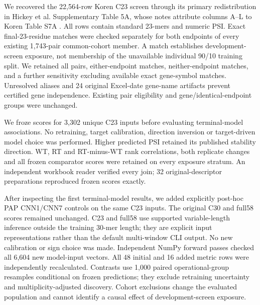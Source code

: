 \documentclass[11pt,a4paper]{article}
\begin{document}
We recovered the 22,564-row Koren C23 screen through its primary redistribution
in Hickey et al. Supplementary Table 5A, whose notes attribute columns A--L
to Koren Table S7A \cite{koren,hickey}. All rows contain standard 23-mers
and numeric PSI. Exact final-23-residue matches were checked separately for
both endpoints of every existing 1,743-pair common-cohort member. A match
establishes development-screen exposure, not membership of the unavailable
individual 90/10 training split. We retained all pairs, either-endpoint
matches, neither-endpoint matches, and a further sensitivity excluding
available exact gene-symbol matches. Unresolved aliases and 24 original
Excel-date gene-name artifacts prevent certified gene independence.
Existing pair eligibility and gene/identical-endpoint groups were unchanged.

We froze scores for 3,302 unique C23 inputs before evaluating terminal-model
associations. No retraining, target calibration, direction inversion or
target-driven model choice was performed. Higher predicted PSI retained its
published stability direction. WT, RT and RT-minus-WT rank correlations,
both replicate changes and all frozen comparator scores were retained on
every exposure stratum. An independent workbook reader verified every join;
32 original-descriptor preparations reproduced frozen scores exactly.

After inspecting the first terminal-model results, we added explicitly
post-hoc PAP CNN1/CNN7 controls on the same C23 inputs. The original C30 and
full58 scores remained unchanged. C23 and full58 use supported variable-length
inference outside the training 30-mer length; they are explicit input
representations rather than the default multi-window CLI output. No new
calibration or sign choice was made. Independent NumPy forward passes checked
all 6,604 new model-input vectors. All 48 initial and 16 added metric rows
were independently recalculated. Contrasts use 1,000 paired operational-group
resamples conditional on frozen predictions; they exclude retraining uncertainty
and multiplicity-adjusted discovery. Cohort exclusions change the evaluated
population and cannot identify a causal effect of development-screen exposure.
\end{document}

